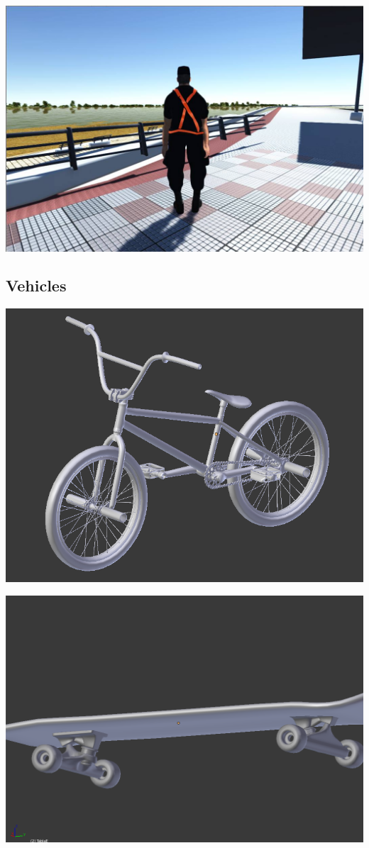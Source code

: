 \documentclass{article}
\begin{document}
  \includegraphics[width=\textwidth]{42.jpg}
  
  \subsection{Vehicles}

  \includegraphics[width=\textwidth]{12.png}

  \includegraphics[width=\textwidth]{13.png}
  
\end{document}
